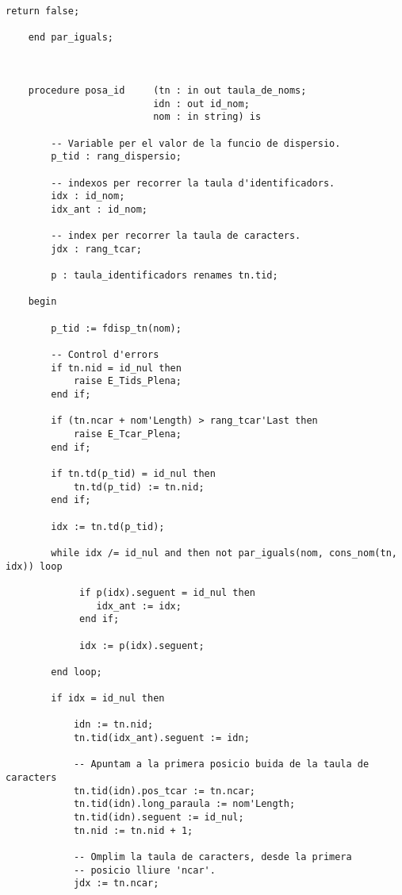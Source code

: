\documentclass[10pt]{report}
\begin{document}
\begin{lstlisting}[style=Ada]
        return false;
    
    end par_iguals;
        


    procedure posa_id     (tn : in out taula_de_noms; 
                          idn : out id_nom; 
                          nom : in string) is
        
        -- Variable per el valor de la funcio de dispersio.
        p_tid : rang_dispersio;
        
        -- indexos per recorrer la taula d'identificadors.
        idx : id_nom;
        idx_ant : id_nom; 
        
        -- index per recorrer la taula de caracters.
        jdx : rang_tcar; 
        
        p : taula_identificadors renames tn.tid;
        
    begin
    
        p_tid := fdisp_tn(nom);
        
        -- Control d'errors
        if tn.nid = id_nul then
            raise E_Tids_Plena;
        end if;
        
        if (tn.ncar + nom'Length) > rang_tcar'Last then
            raise E_Tcar_Plena;
        end if;

        if tn.td(p_tid) = id_nul then
            tn.td(p_tid) := tn.nid;
        end if;
        
        idx := tn.td(p_tid);

        while idx /= id_nul and then not par_iguals(nom, cons_nom(tn, idx)) loop
             
             if p(idx).seguent = id_nul then
                idx_ant := idx;
             end if;
             
             idx := p(idx).seguent;     
            
        end loop;
        
        if idx = id_nul then

            idn := tn.nid;
            tn.tid(idx_ant).seguent := idn;
            
            -- Apuntam a la primera posicio buida de la taula de caracters
            tn.tid(idn).pos_tcar := tn.ncar; 
            tn.tid(idn).long_paraula := nom'Length;
            tn.tid(idn).seguent := id_nul;
            tn.nid := tn.nid + 1;
            
            -- Omplim la taula de caracters, desde la primera 
            -- posicio lliure 'ncar'.
            jdx := tn.ncar;
            

\end{lstlisting}
\end{document}
